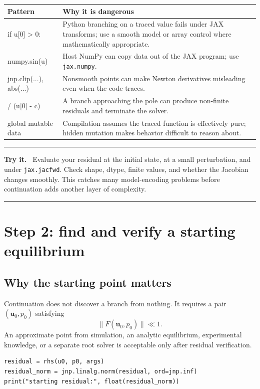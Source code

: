 \documentclass[11pt,oneside]{book}
\newcommand{\state}{\bm{u}}
\newcommand{\residual}{F}
\newenvironment{trythis}
  {\par\medskip\noindent\begin{minipage}{\textwidth}
   \color{JaxTeal}\rule{\textwidth}{0.8pt}\par
   \textbf{Try it.}\ \color{black}}
  {\par\color{JaxTeal}\rule{\textwidth}{0.8pt}
   \end{minipage}\par\medskip}
\begin{document}
\begin{tabularx}{\textwidth}{>{\ttfamily}p{}X}
\toprule
\normalfont Pattern & Why it is dangerous\\
\midrule
if u[0] > 0: & Python branching on a traced value fails under JAX transforms;
use a smooth model or array control where mathematically appropriate.\\
numpy.sin(u) & Host NumPy can copy data out of the JAX program; use
\texttt{jax.numpy}.\\
jnp.clip(...), abs(...) & Nonsmooth points can make Newton derivatives
misleading even when the code traces.\\
1 / (u[0] - c) & A branch approaching the pole can produce non-finite
residuals and terminate the solver.\\
global mutable data & Compilation assumes the traced function is effectively
pure; hidden mutation makes behavior difficult to reason about.\\
\bottomrule
\end{tabularx}

\begin{trythis}
Evaluate your residual at the initial state, at a small perturbation, and under
\texttt{jax.jacfwd}. Check shape, dtype, finite values, and whether the
Jacobian changes smoothly. This catches many model-encoding problems before
continuation adds another layer of complexity.
\end{trythis}

\chapter{Step 2: find and verify a starting equilibrium}

\section{Why the starting point matters}

Continuation does not discover a branch from nothing. It requires a pair
$(\state_0,p_0)$ satisfying
\[
  \|\residual(\state_0,p_0)\|\ll1.
\]
An approximate point from simulation, an analytic equilibrium, experimental
knowledge, or a separate root solver is acceptable only after residual
verification.

\begin{lstlisting}
residual = rhs(u0, p0, args)
residual_norm = jnp.linalg.norm(residual, ord=jnp.inf)
print("starting residual:", float(residual_norm))
\end{lstlisting}
\end{document}
